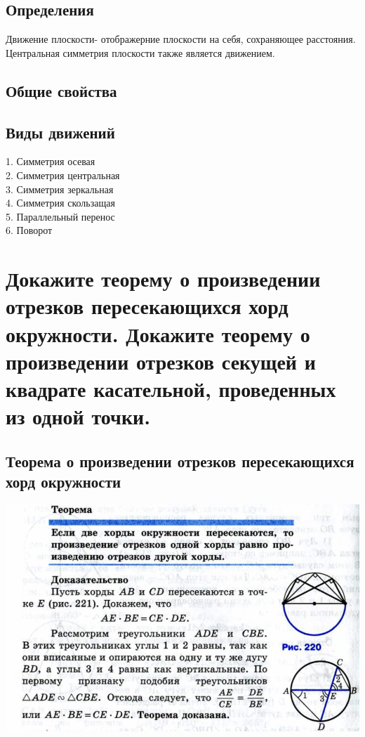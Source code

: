 \documentclass[12pt, letterpaper]{article}
\begin{document}
\subsection{Определения}
Движение плоскости- отображерние плоскости на себя, сохраняющее расстояния. \\
Центральная симметрия плоскости также является движением. \\
\subsection{Общие свойства}

\subsection{Виды движений}
1. Симметрия осевая \\
2. Симметрия центральная \\
3. Симметрия зеркальная \\
4. Симметрия скользащая \\
5. Параллельный перенос \\
6. Поворот \\




\section {Докажите теорему о произведении отрезков пересекающихся хорд окружности. Докажите теорему о произведении отрезков секущей и квадрате касательной, проведенных из одной точки.}

\subsection{Теорема о произведении отрезков пересекающихся хорд окружности}
\includegraphics[scale=0.3]{photo10.jpg}
\end{document}
